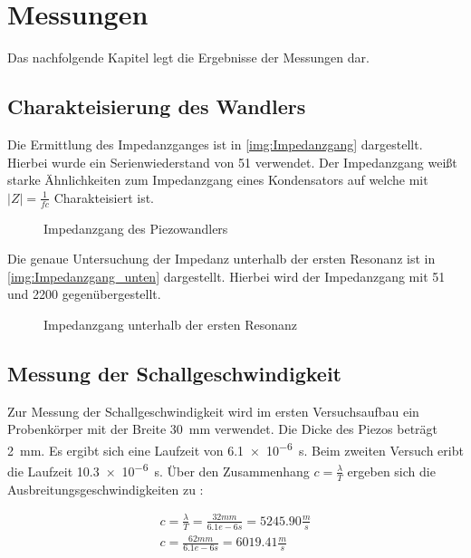 \chapter{Messungen} \label{Messungen}

Das nachfolgende Kapitel legt die Ergebnisse der Messungen dar. 



\section{Charakteisierung des Wandlers}

Die Ermittlung des Impedanzganges ist in \autoref{img:Impedanzgang} dargestellt. Hierbei wurde ein Serienwiederstand von \SI{51}{\Omega} verwendet. Der Impedanzgang weißt starke Ähnlichkeiten zum Impedanzgang eines Kondensators auf welche mit \(|Z| = \frac{1}{f c} \) Charakteisiert ist.


\begin{figure}[h]
    \centering
    
    \caption{Impedanzgang des Piezowandlers}
    \label{img:Impedanzgang}
\end{figure}


Die genaue Untersuchung der Impedanz unterhalb der ersten Resonanz ist in \autoref{img:Impedanzgang_unten} dargestellt. Hierbei wird der Impedanzgang mit \SI{51}{\Omega} und \SI{2200}{\Omega} gegenübergestellt.

\begin{figure}[h]
    \centering
    
    \caption{Impedanzgang unterhalb der ersten Resonanz}
    \label{img:Impedanzgang_unten}
\end{figure}




\section{Messung der Schallgeschwindigkeit} \label{Aufbau_Schall}
Zur Messung der Schallgeschwindigkeit wird im ersten Versuchsaufbau ein Probenkörper mit der Breite \SI{30}{mm} verwendet. Die Dicke des Piezos beträgt  \SI{2}{mm}. Es ergibt sich eine Laufzeit von \SI{6.1e-6}{s}. Beim zweiten Versuch eribt die Laufzeit \SI{10.3e-6}{s}.
Über den Zusammenhang  \(c=\frac{\lambda}{T}\) ergeben sich die Ausbreitungsgeschwindigkeiten zu :

\begin{equation*}
    \begin{split}
    c = \frac{\lambda}{T} = \frac{32 mm}{6.1e-6 s} = 5245.90 \frac{m}{s}  \\[.4cm]
    c = \frac{62 mm}{6.1e-6 s} = 6019.41 \frac{m}{s}  
    \end{split}
\end{equation*}




